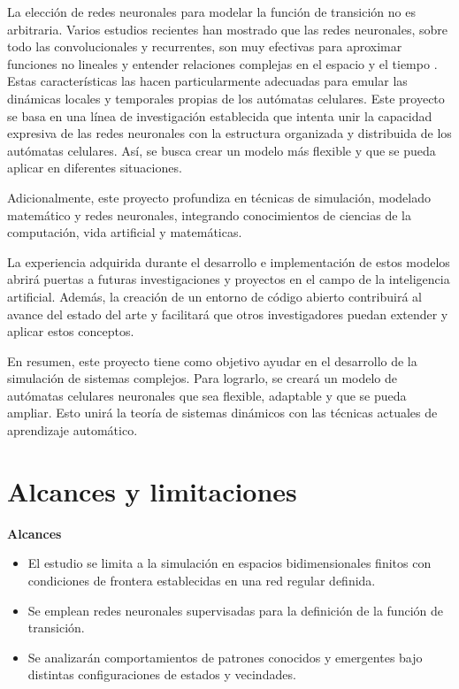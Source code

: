 La elección de redes neuronales para modelar la función de transición no es arbitraria. Varios estudios recientes han mostrado que las redes neuronales, sobre todo las convolucionales y recurrentes, son muy efectivas para aproximar funciones no lineales y entender relaciones complejas en el espacio y el tiempo \cite{mordvintsev2020_nca, mordvintsev2020growing}. Estas características las hacen particularmente adecuadas para emular las dinámicas locales y temporales propias de los autómatas celulares. Este proyecto se basa en una línea de investigación establecida que intenta unir la capacidad expresiva de las redes neuronales con la estructura organizada y distribuida de los autómatas celulares. Así, se busca crear un modelo más flexible y que se pueda aplicar en diferentes situaciones.

Adicionalmente, este proyecto profundiza en técnicas de simulación, modelado matemático y redes neuronales, integrando conocimientos de ciencias de la computación, vida artificial y matemáticas.

La experiencia adquirida durante el desarrollo e implementación de estos modelos abrirá puertas a futuras investigaciones y proyectos en el campo de la inteligencia artificial. Además, la creación de un entorno de código abierto contribuirá al avance del estado del arte y facilitará que otros investigadores puedan extender y aplicar estos conceptos.

En resumen, este proyecto tiene como objetivo ayudar en el desarrollo de la simulación de sistemas complejos. Para lograrlo, se creará un modelo de autómatas celulares neuronales que sea flexible, adaptable y que se pueda ampliar. Esto unirá la teoría de sistemas dinámicos con las técnicas actuales de aprendizaje automático.

\section{Alcances y limitaciones}

\textbf{Alcances}

\begin{itemize}
	
	\item El estudio se limita a la simulación en espacios bidimensionales finitos con condiciones de frontera establecidas en una red regular definida.
	
	\item Se emplean redes neuronales supervisadas para la definición de la función de transición.
	
	\item Se analizarán comportamientos de patrones conocidos y emergentes bajo distintas configuraciones de estados y vecindades.
	
\end{itemize}

